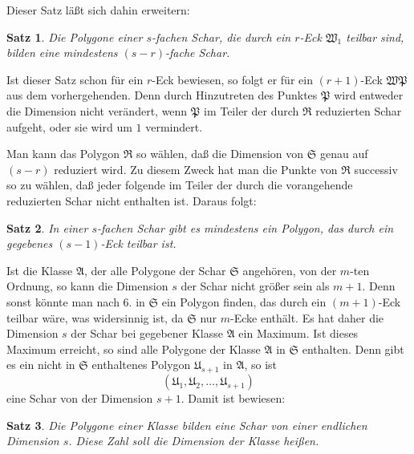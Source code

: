 \documentclass[12pt,a4paper]{article}
\newtheorem*{satz}{Satz}
\begin{document}
Dieser Satz läßt sich dahin erweitern:

\begin{satz}
Die Polygone einer $s$-fachen Schar, die durch ein $r$-Eck $\mathfrak{W}_1$ teilbar sind, bilden eine mindestens $(s-r)$-fache Schar.
\end{satz}

Ist dieser Satz schon für ein $r$-Eck bewiesen, so folgt er für ein $(r+1)$-Eck $\mathfrak{W}\mathfrak{P}$ aus dem vorhergehenden. Denn durch Hinzutreten des Punktes $\mathfrak{P}$ wird entweder die Dimension nicht verändert, wenn $\mathfrak{P}$ im Teiler der durch $\mathfrak{R}$ reduzierten Schar aufgeht, oder sie wird um $1$ vermindert.

Man kann das Polygon $\mathfrak{R}$ so wählen, daß die Dimension von $\mathfrak{S}$ genau auf $(s-r)$ reduziert wird. Zu diesem Zweck hat man die Punkte von $\mathfrak{R}$ successiv so zu wählen, daß jeder folgende im Teiler der durch die vorangehende reduzierten Schar nicht enthalten ist. Daraus folgt:

\begin{satz}
In einer $s$-fachen Schar gibt es mindestens ein Polygon, das durch ein gegebenes $(s-1)$-Eck teilbar ist.
\end{satz}

Ist die Klasse $\mathfrak{A}$, der alle Polygone der Schar $\mathfrak{S}$ angehören, von der $m$-ten Ordnung, so kann die Dimension $s$ der Schar nicht größer sein als $m+1$. Denn sonst könnte man nach 6. in $\mathfrak{S}$ ein Polygon finden, das durch ein $(m+1)$-Eck teilbar wäre, was widersinnig ist, da $\mathfrak{S}$ nur $m$-Ecke enthält. Es hat daher die Dimension $s$ der Schar bei gegebener Klasse $\mathfrak{A}$ ein Maximum. Ist dieses Maximum erreicht, so sind alle Polygone der Klasse $\mathfrak{A}$ in $\mathfrak{S}$ enthalten. Denn gibt es ein nicht in $\mathfrak{S}$ enthaltenes Polygon $\mathfrak{U}_{s+1}$ in $\mathfrak{A}$, so ist
\[
(\mathfrak{U}_1, \mathfrak{U}_2, \ldots, \mathfrak{U}_{s+1})
\]
eine Schar von der Dimension $s+1$. Damit ist bewiesen:

\begin{satz}
Die Polygone einer Klasse bilden eine Schar von einer endlichen Dimension $s$. Diese Zahl soll die \emph{Dimension der Klasse} heißen.
\end{satz}
\end{document}
